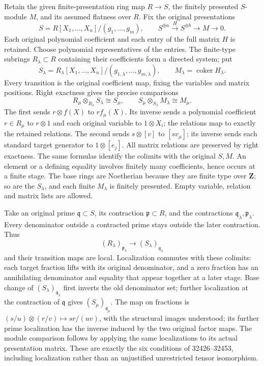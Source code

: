 Retain the given finite-presentation ring map \(R\to S\), the finitely presented \(S\)-module \(M\), and its assumed flatness over \(R\). Fix the original presentations \[
 S=R[X_1,\ldots,X_n]/(g_1,\ldots,g_m),\qquad
 S^{\oplus a}\xrightarrow{H}S^{\oplus b}\longrightarrow M\longrightarrow0.
\] Each original polynomial coefficient and each entry of the full matrix \(H\) is retained. Choose polynomial representatives of the entries. The finite-type subrings \(R_\lambda\subset R\) containing their coefficients form a directed system; put \[
 S_\lambda=R_\lambda[X_1,\ldots,X_n]/(g_{1,\lambda},\ldots,g_{m,\lambda}),
 \qquad M_\lambda=\operatorname{coker}H_\lambda.
\] Every transition is the original coefficient map, fixing the variables and matrix positions. Right exactness gives the precise comparisons \[
 R_\mu\otimes_{R_\lambda}S_\lambda\cong S_\mu,
 \qquad S_\mu\otimes_{S_\lambda}M_\lambda\cong M_\mu.
\] The first sends \(r\otimes f(X)\) to \(rf_\mu(X)\). Its inverse sends a polynomial coefficient \(r\in R_\mu\) to \(r\otimes1\) and each original variable to \(1\otimes X_i\); the relations map to exactly the retained relations. The second sends \(s\otimes[v]\) to \([s v_\mu]\); its inverse sends each standard target generator to \(1\otimes[e_j]\). All matrix relations are preserved by right exactness. The same formulas identify the colimits with the original \(S,M\). An element or a defining equality involves finitely many coefficients, hence occurs at a finite stage. The base rings are Noetherian because they are finite type over \(\mathbf Z\); so are the \(S_\lambda\), and each finite \(M_\lambda\) is finitely presented. Empty variable, relation and matrix lists are allowed.

Take an original prime \(\mathfrak q\subset S\), its contraction \(\mathfrak p\subset R\), and the contractions \(\mathfrak q_\lambda,\mathfrak p_\lambda\). Every denominator outside a contracted prime stays outside the later contraction. Thus \[
 (R_\lambda)_{\mathfrak p_\lambda}\longrightarrow
 (S_\lambda)_{\mathfrak q_\lambda}
\] and their transition maps are local. Localization commutes with these colimits: each target fraction lifts with its original denominator, and a zero fraction has an annihilating denominator and equality that appear together at a later stage. Base change of \((S_\lambda)_{\mathfrak q_\lambda}\) first inverts the old denominator set; further localization at the contraction of \(\mathfrak q\) gives \((S_\mu)_{\mathfrak q_\mu}\). The map on fractions is \((s/u)\otimes(r/v)\mapsto sr/(uv)\), with the structural images understood; its further prime localization has the inverse induced by the two original factor maps. The module comparison follows by applying the same localizations to its actual presentation matrix. These are exactly the six conditions of 32426--32453, including localization rather than an unjustified unrestricted tensor isomorphism.

